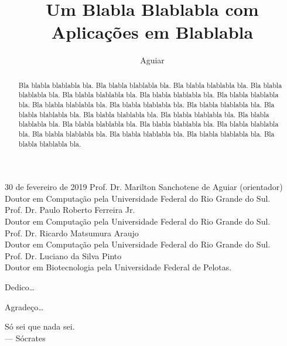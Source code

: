 \documentclass[tese,capa]{texufpel}
\title{Um Blabla Blablabla com Aplicações em Blablabla}
\author{Aguiar}{Marilton Sanchotene de}
\begin{document}

\maketitle 

\sloppy

\fichacatalografica

\begin{aprovacao}{30 de fevereiro de 2019} %
\noindent Prof. Dr. Marilton Sanchotene de Aguiar (orientador)\\
Doutor em Computação pela Universidade Federal do Rio Grande do Sul.\\[1cm]

\noindent Prof. Dr. Paulo Roberto Ferreira Jr.\\
Doutor em Computação pela Universidade Federal do Rio Grande do Sul.\\[1cm]

\noindent Prof. Dr. Ricardo Matsumura Araujo\\
Doutor em Computação pela Universidade Federal do Rio Grande do Sul.\\[1cm]

\noindent Prof. Dr. Luciano da Silva Pinto\\
Doutor em Biotecnologia pela Universidade Federal de Pelotas.
\end{aprovacao}

\begin{dedicatoria}
  Dedico\ldots 
\end{dedicatoria}

\begin{agradecimentos}
  Agradeço\ldots 
\end{agradecimentos}

\begin{epigrafe}
  Só sei que nada sei.\\
  {\sc --- Sócrates}
\end{epigrafe}

\begin{abstract}
Bla blabla blablabla bla.  Bla blabla blablabla bla.  Bla blabla
blablabla bla.  Bla blabla blablabla bla.  Bla blabla blablabla bla.
Bla blabla blablabla bla.  Bla blabla blablabla bla.  Bla blabla
blablabla bla.  Bla blabla blablabla bla.  Bla blabla blablabla bla.
Bla blabla blablabla bla.  Bla blabla blablabla bla.  Bla blabla
blablabla bla.  Bla blabla blablabla bla.  Bla blabla blablabla bla.
Bla blabla blablabla bla.  Bla blabla blablabla bla.  Bla blabla
blablabla bla.  Bla blabla blablabla bla.  Bla blabla blablabla bla.
Bla blabla blablabla bla.
\end{abstract}
\end{document}
